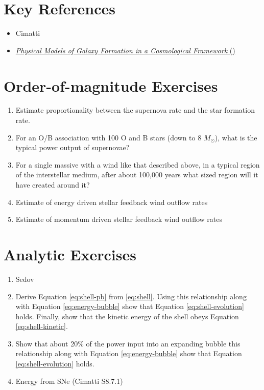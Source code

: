 \section{Key References}

\begin{itemize}
  \item Cimatti
  \item
    \href{https://ui.adsabs.harvard.edu/abs/2015ARA%26A..53...51S/abstract}
    {{\it Physical Models of Galaxy Formation in a Cosmological
        Framework} (\citealt{somerville15a})}
\end{itemize}

\section{Order-of-magnitude Exercises}

\begin{enumerate} 
\item Estimate proportionality between the supernova rate and the star
  formation rate.
\item For an O/B association with 100 O and B stars (down to 8
$M_\odot$), what is the typical power output of supernovae?
\item For a single massive with a wind like that described above, in a
typical region of the interstellar medium, after about 100,000 years
what sized region will it have created around it?
\item Estimate of energy driven stellar feedback wind outflow rates
\item Estimate of momentum driven stellar feedback wind outflow rates
\end{enumerate} 

\section{Analytic Exercises}

\begin{enumerate}
\item Sedov
\item Derive Equation \ref{eq:shell-pb} from \ref{eq:shell}. Using
this relationship along with Equation \ref{eq:energy-bubble} show that
Equation \ref{eq:shell-evolution} holds. Finally, show that the
kinetic energy of the shell obeys Equation \ref{eq:shell-kinetic}.
\item Show that about 20\% of the power input into an expanding bubble 
this relationship along with Equation \ref{eq:energy-bubble} show that
Equation \ref{eq:shell-evolution} holds.
\item Energy from SNe (Cimatti S8.7.1)
\end{enumerate}

%


  
